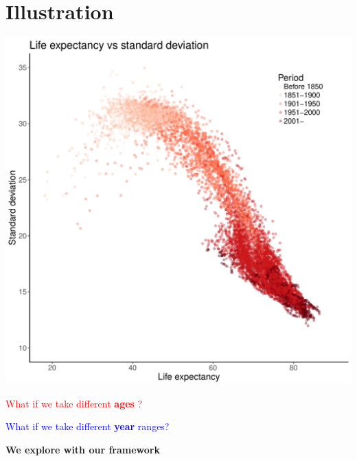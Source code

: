 \documentclass[xcolor={dvipsnames}]{beamer}
\begin{document}
\section{Illustration}
\begin{frame}
		
			\begin{center}
		\includegraphics[scale=.4]{Figures/ex_sd}
				\end{center}
			
\end{frame}

\begin{frame}
\begin{center}

		\LARGE{
\textcolor{red}{ What if we take different \textbf{ages} ? }
\linebreak
\pause
 
\textcolor{blue}{ What if we take different \textbf{year} ranges? }
\linebreak
\pause


\textbf{We explore with our framework}}

\end{center}			
\end{frame}
\end{document}
